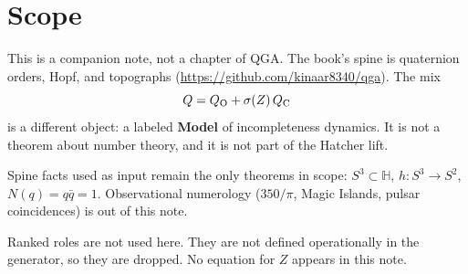 \section*{Scope}

This is a companion note, not a chapter of QGA.
The book's spine is quaternion orders, Hopf, and topographs
(\url{https://github.com/kinaar8340/qga}).
The mix
\[
Q = Q_{\mathrm{O}} + \sigma(Z)\,Q_{\mathrm{C}}
\]
is a different object: a labeled \textbf{Model} of incompleteness dynamics.
It is not a theorem about number theory, and it is not part of the Hatcher lift.

Spine facts used as input remain the only theorems in scope:
\(S^{3}\subset\mathbb{H}\),
\(h:S^{3}\to S^{2}\),
\(N(q)=q\bar q=1\).
Observational numerology (\(350/\pi\), Magic Islands, pulsar coincidences)
is out of this note.

Ranked roles are not used here.
They are not defined operationally in the generator, so they are dropped.
No equation for \(Z\) appears in this note.
